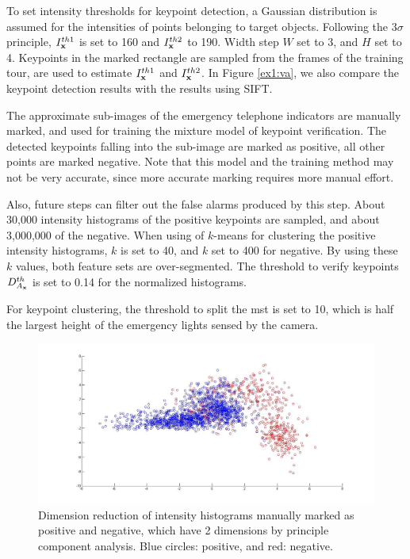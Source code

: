 To set intensity thresholds for keypoint detection, a Gaussian distribution is assumed for the intensities of points belonging to target objects. Following the $3\sigma$ principle, $I^{th1}_{\bf{x}}$ is set to 160 and $I^{th2}_{\bf{x}}$ to 190. Width step $W$ set to 3, and $H$ set to 4. Keypoints in the marked rectangle are sampled from the frames of the training tour, are used to estimate $I^{th1}_{\bf{x}}$  and $I^{th2}_{\bf{x}}$.   In Figure \ref{ex1:va}, we also compare the keypoint detection results with the results using SIFT.


  The approximate sub-images of the emergency telephone indicators are manually marked, and used for training the mixture model of keypoint verification. The detected keypoints falling into the sub-image are marked as positive, all other points are marked negative. Note that this model and the training method may not be very accurate, since more accurate marking requires more manual effort.

  Also, future steps can filter out the false alarms produced by this step.  About 30,000 intensity histograms of the positive keypoints are sampled, and about 3,000,000 of the negative. When using of $k$-means for clustering the positive intensity histograms, $k$ is set to 40, and $k$ set to 400 for negative. By using these $k$ values,  both feature sets are over-segmented. The threshold to verify keypoints $D^{th}_{A_{\bf{x}}}$ is set to 0.14 for the normalized histograms.




For keypoint clustering, the threshold to split the mst is set to 10, which is half the largest height of the emergency lights sensed by the camera.

\begin{figure}
\includegraphics[width=1\textwidth,bb=0 0 1367 651]{untitled.jpg}
\caption[Positive and negative training examples]{Dimension reduction of intensity histograms manually marked as positive and negative, which have 2 dimensions by principle component analysis. Blue circles: positive, and red: negative.}
\label{ex1:v}
\end{figure}





